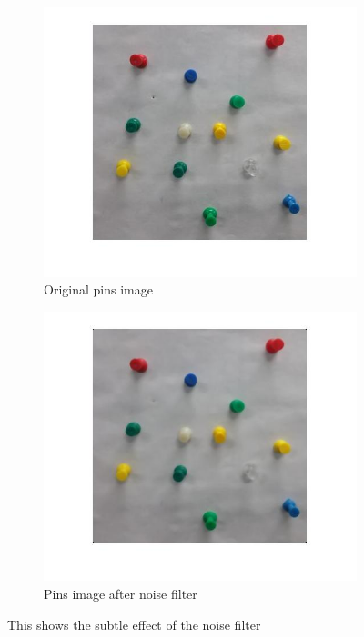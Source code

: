\documentclass[12pt]{article}
\begin{document}
\begin{figure}
    \begin{subfigure}{.5\textwidth}
        \centering
        \includegraphics[width=\linewidth]{pins_original}
        \caption{Original pins image}
    \end{subfigure}\hfill
    \begin{subfigure}{.5\textwidth}
        \centering
        \includegraphics[width=\linewidth]{pins_filt}
        \caption{Pins image after noise filter}
    \end{subfigure}
    \caption{This shows the subtle effect of the noise filter}
    \label{fig_denoise}
\end{figure}
\end{document}
